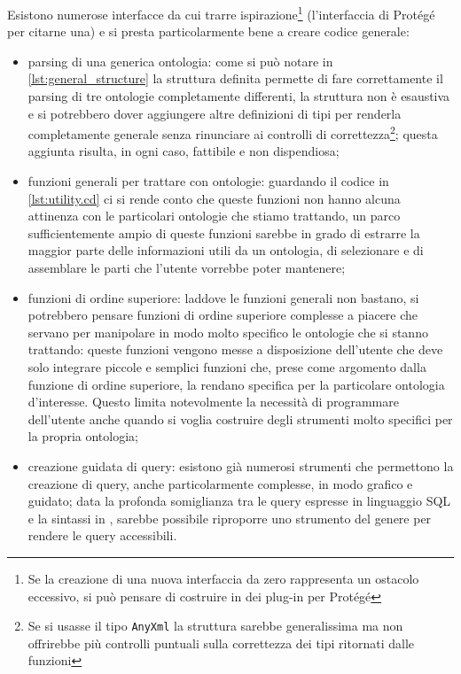 Esistono numerose interfacce da cui trarre ispirazione\footnote{Se la creazione di una nuova interfaccia da zero rappresenta un ostacolo eccessivo, si può pensare di costruire in \cduce dei plug-in per Protégé} (l'interfaccia di Protégé per citarne una) e \cduce si presta particolarmente bene a creare codice generale:
\begin{itemize}
	\item parsing di una generica ontologia: come si può notare in \ref{lst:general_structure} la struttura definita permette di fare correttamente il parsing di tre ontologie completamente differenti, la struttura non è esaustiva e si potrebbero dover aggiungere altre definizioni di tipi per renderla completamente generale senza rinunciare ai controlli di correttezza\footnote{Se si usasse il tipo \texttt{AnyXml} la struttura sarebbe generalissima ma non offrirebbe più controlli puntuali sulla correttezza dei tipi ritornati dalle funzioni}; questa aggiunta risulta, in ogni caso, fattibile e non dispendiosa;
	\item funzioni generali per trattare con ontologie: guardando il codice in \ref{lst:utility.cd} ci si rende conto che queste funzioni non hanno alcuna attinenza con le particolari ontologie che stiamo trattando, un parco sufficientemente ampio di queste funzioni sarebbe in grado di estrarre la maggior parte delle informazioni utili da un ontologia, di selezionare e di assemblare le parti che l'utente vorrebbe poter mantenere;
	\item\label{ch5.4_func}funzioni di ordine superiore: laddove le funzioni generali non bastano, si potrebbero pensare funzioni di ordine superiore complesse a piacere che servano per manipolare in modo molto specifico le ontologie che si stanno trattando: queste funzioni vengono messe a disposizione dell'utente che deve solo integrare piccole e semplici funzioni che, prese come argomento dalla funzione di ordine superiore, la rendano specifica per la particolare ontologia d'interesse. Questo limita notevolmente la necessità di programmare dell'utente anche quando si voglia costruire degli strumenti molto specifici per la propria ontologia;
	\item creazione guidata di query: esistono già numerosi strumenti che permettono la creazione di query, anche particolarmente complesse, in modo grafico e guidato; data la profonda somiglianza tra le query espresse in linguaggio SQL e la sintassi in \cduce, sarebbe possibile riproporre uno strumento del genere per rendere le query accessibili.	
\end{itemize}
